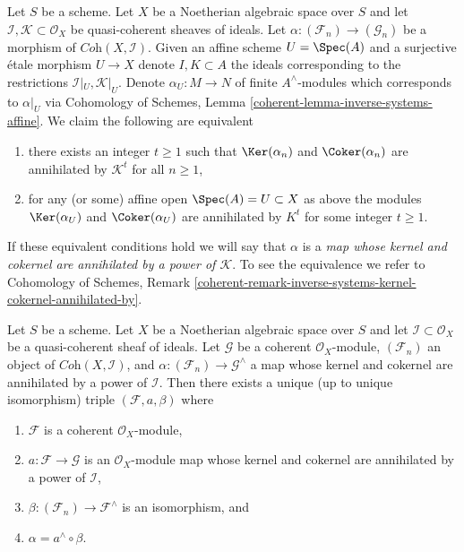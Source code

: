 \begin{remark}
\label{remark-inverse-systems-kernel-cokernel-annihilated-by}
Let $S$ be a scheme. Let $X$ be a Noetherian algebraic space over $S$ and let
$\mathcal{I}, \mathcal{K} \subset \mathcal{O}_X$ be quasi-coherent sheaves of
ideals. Let $\alpha : (\mathcal{F}_n) \to (\mathcal{G}_n)$ be a morphism of
$\textit{Coh}(X, \mathcal{I})$.
Given an affine scheme $U = \Spec(A)$ and a surjective \'etale morphism
$U \to X$ denote $I, K \subset A$ the ideals corresponding to the restrictions
$\mathcal{I}|_U, \mathcal{K}|_U$. Denote $\alpha_U : M \to N$ of finite
$A^\wedge$-modules which corresponds to $\alpha|_U$ via
Cohomology of Schemes, Lemma \ref{coherent-lemma-inverse-systems-affine}.
We claim the following are equivalent
\begin{enumerate}
\item there exists an integer $t \geq 1$ such that
$\Ker(\alpha_n)$ and $\Coker(\alpha_n)$
are annihilated by $\mathcal{K}^t$ for all $n \geq 1$,
\item for any (or some) affine open $\Spec(A) = U \subset X$ as above
the modules $\Ker(\alpha_U)$ and $\Coker(\alpha_U)$
are annihilated by $K^t$ for some integer $t \geq 1$.
\end{enumerate}
If these equivalent conditions hold we will say that $\alpha$ is a
{\it map whose kernel and cokernel are annihilated by a power of
$\mathcal{K}$}. To see the equivalence we refer to
Cohomology of Schemes, Remark
\ref{coherent-remark-inverse-systems-kernel-cokernel-annihilated-by}.
\end{remark}

\begin{lemma}
\label{lemma-existence-easy}
Let $S$ be a scheme. Let $X$ be a Noetherian algebraic space over $S$ and let
$\mathcal{I} \subset \mathcal{O}_X$ be a quasi-coherent sheaf of ideals.
Let $\mathcal{G}$ be a coherent $\mathcal{O}_X$-module, $(\mathcal{F}_n)$
an object of $\textit{Coh}(X, \mathcal{I})$, and
$\alpha : (\mathcal{F}_n) \to \mathcal{G}^\wedge$
a map whose kernel and cokernel are annihilated by a power of $\mathcal{I}$.
Then there exists a unique (up to unique isomorphism) triple
$(\mathcal{F}, a, \beta)$ where
\begin{enumerate}
\item $\mathcal{F}$ is a coherent $\mathcal{O}_X$-module,
\item $a : \mathcal{F} \to \mathcal{G}$ is an $\mathcal{O}_X$-module map
whose kernel and cokernel are annihilated by a power of $\mathcal{I}$,
\item $\beta : (\mathcal{F}_n) \to \mathcal{F}^\wedge$ is an isomorphism, and
\item $\alpha = a^\wedge \circ \beta$.
\end{enumerate}
\end{lemma}

